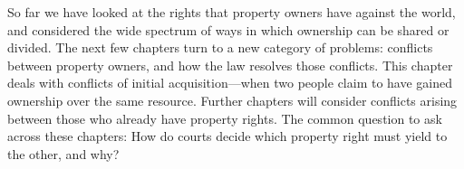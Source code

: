 So far we have looked at the rights that property owners have against the world,
and considered the wide spectrum of ways in which ownership can be shared or
divided. The next few chapters turn to a new category of problems: conflicts
between property owners, and how the law resolves those conflicts.
This chapter deals with conflicts of initial
acquisition---when two people claim to have gained ownership over the same
resource. Further chapters will consider conflicts arising between those who
already have property rights.
The common question to ask across these chapters: How do courts decide which
property right must yield to the other, and why?


